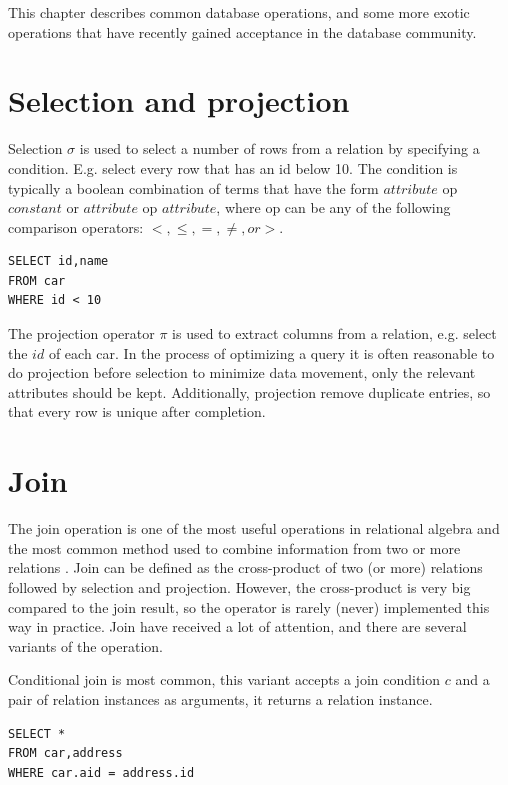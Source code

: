This chapter describes common database operations, and some more
exotic operations that have recently gained acceptance in the database
community.

\section{Selection and projection}

Selection $\sigma$ is used to select a number of rows from a relation
by specifying a condition. E.g. select every row that has an id below
10. The condition is typically a boolean combination of terms that
have the form $attribute$ op $constant$ or $attribute$ op $attribute$,
where op can be any of the following comparison operators: $<, \leq,
=, \neq, or >$. \cite{dbms}

\begin{lstlisting}[caption={Selection and projection example}]
SELECT id,name
FROM car
WHERE id < 10
\end{lstlisting}

The projection operator $\pi$ is used to extract columns from a
relation, e.g.  select the $id$ of each car. In the process of
optimizing a query it is often reasonable to do projection before
selection to minimize data movement, only the relevant attributes
should be kept. Additionally, projection remove duplicate entries, so
that every row is unique after completion.

\section{Join}

The join operation is one of the most useful operations in relational
algebra and the most common method used to combine information from
two or more relations \cite{dbms}. Join can be defined as the
cross-product of two (or more) relations followed by selection and
projection. However, the cross-product is very big compared to the
join result, so the operator is rarely (never) implemented this way in
practice. Join have received a lot of attention, and there are several
variants of the operation.

Conditional join is most common, this variant accepts a join condition
$c$ and a pair of relation instances as arguments, it returns a
relation instance.

\begin{lstlisting}[caption={Join example}, label={lst:join}]
SELECT * 
FROM car,address
WHERE car.aid = address.id
\end{lstlisting}


